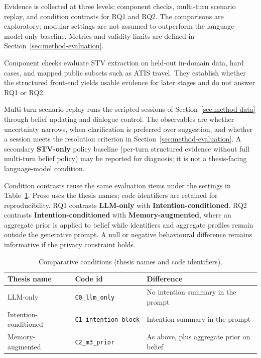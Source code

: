 Evidence is collected at three levels: component checks, multi-turn scenario replay, and condition contrasts for RQ1 and RQ2.
The comparisons are exploratory; modular settings are not assumed to outperform the language-model-only baseline.
Metrics and validity limits are defined in Section~\ref{sec:method-evaluation}.

Component checks evaluate STV extraction on held-out in-domain data, hard cases, and mapped public subsets such as ATIS travel.
They establish whether the structured front-end yields usable evidence for later stages and do not answer RQ1 or RQ2.

Multi-turn scenario replay runs the scripted sessions of Section~\ref{sec:method-data} through belief updating and dialogue control.
The observables are whether uncertainty narrows, when clarification is preferred over suggestion, and whether a session meets the resolution criterion in Section~\ref{sec:method-evaluation}.
A secondary \textbf{STV-only} policy baseline (per-turn structured evidence without full multi-turn belief policy) may be reported for diagnosis; it is not a thesis-facing language-model condition.

Condition contrasts reuse the same evaluation items under the settings in Table~\ref{tab:method-conditions}.
Prose uses the thesis names; code identifiers are retained for reproducibility.
RQ1 contrasts \textbf{LLM-only} with \textbf{Intention-conditioned}.
RQ2 contrasts \textbf{Intention-conditioned} with \textbf{Memory-augmented}, where an aggregate prior is applied to belief while identifiers and aggregate profiles remain outside the generative prompt.
A null or negative behavioural difference remains informative if the privacy constraint holds.

\begin{table}[!ht]
  \centering
  \small
  \caption{Comparative conditions (thesis names and code identifiers).}
  \label{tab:method-conditions}
  \setlength{\tabcolsep}{4pt}
  \begin{tabular}{@{}lp{}p{}@{}}
    \hline
    \textbf{Thesis name} & \textbf{Code id} & \textbf{Difference} \\
    \hline
    LLM-only & \texttt{C0\_llm\_only} & No intention summary in the prompt \\
    Intention-conditioned & \texttt{C1\_intention\_block} & Intention summary in the prompt \\
    Memory-augmented & \texttt{C2\_m3\_prior} & As above, plus aggregate prior on belief \\
    \hline
  \end{tabular}
\end{table}

